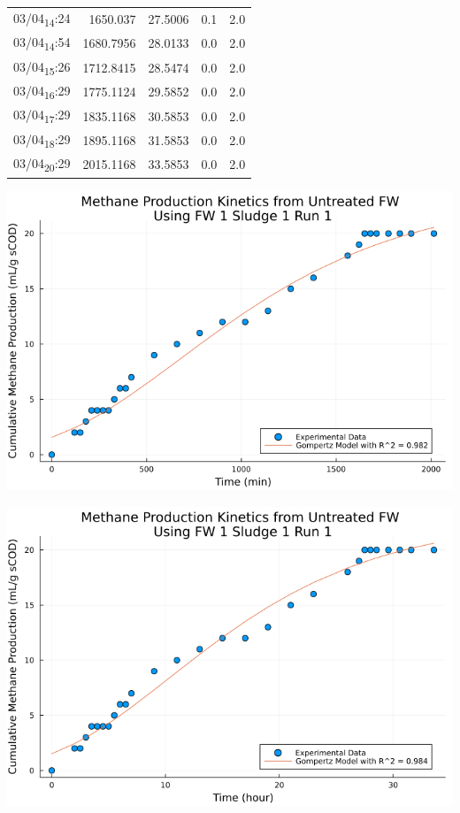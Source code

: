 \documentclass[11pt]{article}
\begin{document}
\begin{center}
\begin{tabular}{lrrrr}
03/04\textsubscript{14}:24 & 1650.037 & 27.5006 & 0.1 & 2.0\\[0pt]
03/04\textsubscript{14}:54 & 1680.7956 & 28.0133 & 0.0 & 2.0\\[0pt]
03/04\textsubscript{15}:26 & 1712.8415 & 28.5474 & 0.0 & 2.0\\[0pt]
03/04\textsubscript{16}:29 & 1775.1124 & 29.5852 & 0.0 & 2.0\\[0pt]
03/04\textsubscript{17}:29 & 1835.1168 & 30.5853 & 0.0 & 2.0\\[0pt]
03/04\textsubscript{18}:29 & 1895.1168 & 31.5853 & 0.0 & 2.0\\[0pt]
03/04\textsubscript{20}:29 & 2015.1168 & 33.5853 & 0.0 & 2.0\\[0pt]
\end{tabular}
\end{center}

\begin{center}
\includegraphics[width=.9\linewidth]{../plots/BMPs/Untreated FW/methane_kinetics_untreated_fw_s1_r1_min.png}
\end{center}

\begin{center}
\includegraphics[width=.9\linewidth]{../plots/BMPs/Untreated FW/methane_kinetics_untreated_fw_s1_r1_hour.png}
\end{center}
\end{document}
